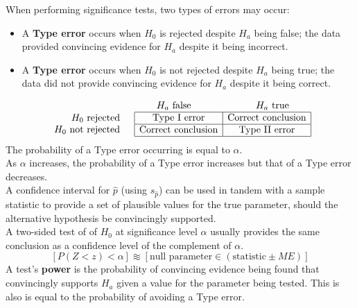 \documentclass[../AP_Statistics.tex]{subfiles}
\begin{document}
		When performing significance tests, two types of errors may occur:
		\begin{itemize}
			\item
				A \textbf{Type  error} occurs when $H_0$ is rejected despite $H_a$ being false; the data provided convincing evidence for $H_a$ despite it being incorrect. 
			\item
				A \textbf{Type  error} occurs when $H_0$ is not rejected despite $H_a$ being true; the data did not provide convincing evidence for $H_a$ despite it being correct.
		\end{itemize}
		\[\begin{array}{cc}
			&\begin{array}{cc} H_a\text{ false} &\hspace{2cm} H_a\text{ true}\end{array} \\
			\begin{array}{r}H_0\text{ rejected} \\ H_0\text{ not rejected}\end{array} &
			\begin{array}{|c|c|}\hline
				\text{Type \Roman{1} error} & \text{Correct conclusion} \\\hline
				\text{Correct conclusion} & \text{Type \Roman{2} error} \\\hline
			\end{array}
		\end{array}\]
		The probability of a Type  error occurring is equal to $\alpha$. \\
		As $\alpha$ increases, the probability of a Type  error increases but that of a Type  error decreases. \\
		A confidence interval for $\hat{p}$ (using $s_{\hat{p}}$) can be used in tandem with a sample statistic to provide a set of plausible values for the true parameter, should the alternative hypothesis be convincingly supported. \\
		A two-sided test of of $H_0$ at significance level $\alpha$ usually provides the same conclusion as a confidence level of the complement of $\alpha$.
		\[[P(Z < z) < \alpha] \approxident [\text{null parameter} \in (\text{statistic} \pm ME)]\]
		A test's \textbf{power} is the probability of convincing evidence being found that convincingly supports $H_a$ given a value for the parameter being tested. This is also is equal to the probability of avoiding a Type  error. 
\end{document}
